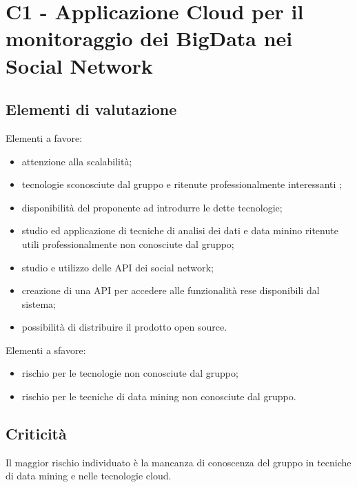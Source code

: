 \section{C1 - Applicazione Cloud per il monitoraggio dei BigData nei Social Network}{
	\subsection{Elementi di valutazione}{
		Elementi a favore:
		\begin{itemize}
			\item attenzione alla scalabilità;
			\item tecnologie sconosciute dal gruppo e ritenute professionalmente interessanti ;
			\item disponibilità del proponente ad introdurre le dette tecnologie;
			\item studio ed applicazione di tecniche di analisi dei dati e data minino ritenute utili professionalmente non conosciute dal gruppo;
			\item studio e utilizzo delle API dei social network;
			\item creazione di una API per accedere alle funzionalità rese disponibili dal sistema;
			\item possibilità di distribuire il prodotto open source.
		\end{itemize}
		
		Elementi a sfavore:
		\begin{itemize}
			\item rischio per le tecnologie non conosciute dal gruppo;
			\item rischio per le tecniche di data mining non conosciute dal gruppo.
		\end{itemize}
	}
	\subsection{Criticità}{
		Il maggior rischio individuato è la mancanza di conoscenza del gruppo in tecniche di data mining e nelle tecnologie cloud.
	}
}
